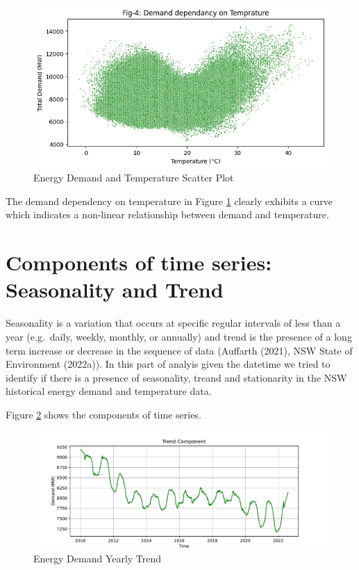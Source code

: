 \documentclass[mstat,12pt]{unswthesis}
\begin{document}
\begin{figure}[H]
\includegraphics[width=1\linewidth,]{images/demand_dependency_on_temp} \caption{Energy Demand and Temperature Scatter Plot}\label{fig:plot-energy-demand-temperature-by-years}
\end{figure}

The demand dependency on temperature in Figure
\ref{fig:plot-energy-demand-temperature-by-years} clearly exhibits a
curve which indicates a non-linear relationship between demand and
temperature.

\hypertarget{components-of-time-series-seasonality-and-trend}{%
\section{Components of time series: Seasonality and
Trend}\label{components-of-time-series-seasonality-and-trend}}

Seasonality is a variation that occurs at specific regular intervals of
less than a year (e.g.~daily, weekly, monthly, or annually) and trend is
the presence of a long term increase or decrease in the sequence of data
(Auffarth (2021), NSW State of Environment (2022a)). In this part of
analyis given the datetime we tried to identify if there is a presence
of seasonality, treand and stationarity in the NSW historical energy
demand and temperature data.

Figure \ref{fig:plot-energy-demand-yearly-trend} shows the components of
time series.

\begin{figure}[H]
\includegraphics[width=1\linewidth,]{ZZSC9020_Group_Report_files/figure-latex/plot-energy-demand-yearly-trend-1} \caption{Energy Demand Yearly Trend}\label{fig:plot-energy-demand-yearly-trend}
\end{figure}
\end{document}
